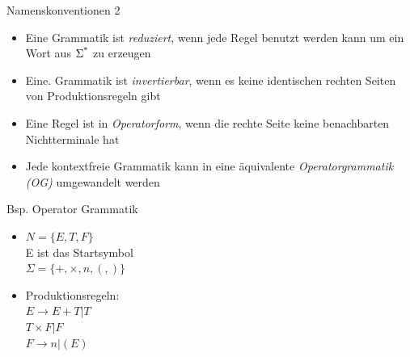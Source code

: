 \documentclass[
10pt,
pantone315, 	%
]{beamer}
\begin{document}
\begin{frame}[t]{Namenskonventionen 2}
	\begin{itemize}[<+->]
			\item
		Eine Grammatik ist \textit{reduziert}, wenn jede Regel benutzt werden kann um ein Wort aus $\Sigma \textsuperscript{*}$ zu erzeugen
		\item
		Eine. Grammatik ist \textit{invertierbar}, wenn es keine identischen rechten Seiten von Produktionsregeln gibt
		\item
		Eine Regel ist in \textit{Operatorform}, wenn die rechte Seite keine benachbarten Nichtterminale hat
		\item 
		Jede kontextfreie Grammatik kann in eine äquivalente \textit{Operatorgrammatik (OG)} umgewandelt werden
		
		
	\end{itemize}
\end{frame}

\begin{frame}[t] {Bsp. Operator Grammatik}
	\begin{itemize}[<+->]
	\item
	$N=\{E, T, F \}$\\
	E ist das Startsymbol \\
	$\Sigma = \{+, \times, n, (, ) \}$
	\item 
	Produktionsregeln:\\
	$E \rightarrow E + T | T$ \\
	$T \times F | F$ \\
	$F \rightarrow n | (E)$
	
	\end{itemize}
\end{frame}
\end{document}
